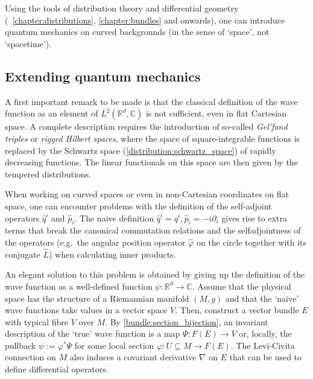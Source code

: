 \section{}

    Using the tools of distribution theory and differential geometry (~\ref{chapter:distributions}, \ref{chapter:bundles} and onwards), one can introduce quantum mechanics on curved backgrounds (in the sense of `space', not `spacetime').

\subsection{Extending quantum mechanics}

    \begin{remark}
        A first important remark to be made is that the classical definition of the wave function as an element of $L^2(\mathbb{R}^d,\mathbb{C})$ is not sufficient, even in flat Cartesian space. A complete description requires the introduction of so-called \textit{Gel'fand triples} or \textit{rigged Hilbert spaces}, where the space of square-integrable functions is replaced by the Schwartz space (\cref{distribution:schwartz_space}) of rapidly decreasing functions. The linear functionals on this space are then given by the tempered distributions.
    \end{remark}

    When working on curved spaces or even in non-Cartesian coordinates on flat space, one can encounter problems with the definition of the self-adjoint operators $\widehat{q}^i$ and $\widehat{p}_i$. The naive definition $\widehat{q}^i = q^i,\widehat{p}_i = -i\partial_i$ gives rise to extra terms that break the canonical commutation relations and the selfadjointness of the operators (e.g.~the angular position operator $\widehat{\varphi}$ on the circle together with its conjugate $\widehat{L}$) when calculating inner products.

    An elegant solution to this problem is obtained by giving up the definition of the wave function as a well-defined function $\psi:\mathbb{R}^d\rightarrow\mathbb{C}$. Assume that the physical space has the structure of a Riemannian manifold $(M,g)$ and that the `naive' wave functions take values in a vector space $V$. Then, construct a vector bundle $E$ with typical fibre $V$ over $M$. By \cref{bundle:section_bijection}, an invariant description of the `true' wave function is a map $\Psi:F(E)\rightarrow V$ or, locally, the pullback $\psi:=\varphi^*\Psi$ for some local section $\varphi:U\subseteq M\rightarrow F(E)$. The Levi-Civita connection on $M$ also induces a covariant derivative $\nabla$ on $E$ that can be used to define differential operators.

